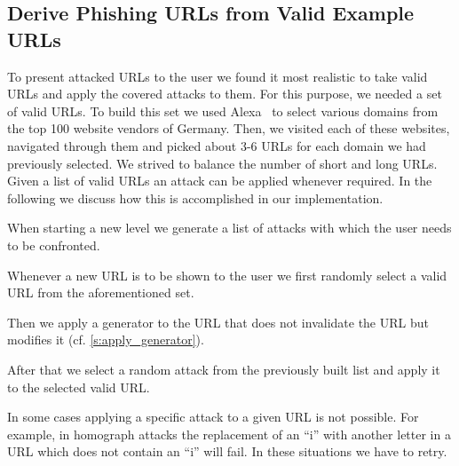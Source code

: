 \subsection{Derive Phishing URLs from Valid Example URLs}
To present attacked URLs to the user we found it most realistic to take valid URLs and apply the covered attacks to them.
For this purpose, we needed a set of valid URLs.
To build this set we used Alexa~\cite{alexa} to select various domains from the top 100 website vendors of Germany.
Then, we visited each of these websites, navigated through them and picked about 3-6 URLs for each domain we had previously selected.
We strived to balance the number of short and long URLs.
Given a list of valid URLs an attack can be applied whenever required.
In the following we discuss how this is accomplished in our implementation.
\begin{description}[leftmargin=0cm]
\item[Generate a List of Attacks for Each Level:] When starting a new level we generate a list of attacks with which the user needs to be confronted.
\item[Select a Valid URL:] Whenever a new URL is to be shown to the user we first randomly select a valid URL from the aforementioned set.
\item[Modify Valid URLs with a Generator:] Then we apply a generator to the URL that does not invalidate the URL but modifies it (cf. \autoref{s:apply_generator}).
\item[Apply an Attack:] After that we select a random attack from the previously built list and apply it to the selected valid URL.
\item[Repeat in Case Attack was not Possible:] In some cases applying a specific attack to a given URL is not possible. For example, in homograph attacks the replacement of an ``i'' with another letter in a URL which does not contain an ``i'' will fail. In these situations we have to retry.
\end{description}

